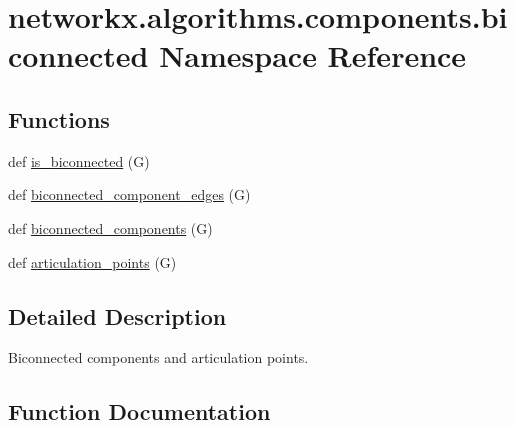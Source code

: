 \hypertarget{namespacenetworkx_1_1algorithms_1_1components_1_1biconnected}{}\section{networkx.\+algorithms.\+components.\+biconnected Namespace Reference}
\label{namespacenetworkx_1_1algorithms_1_1components_1_1biconnected}
\subsection*{Functions}
\begin{DoxyCompactItemize}
\item 
def \hyperlink{namespacenetworkx_1_1algorithms_1_1components_1_1biconnected_a883b29aa8dfc5ce49acd93d453d961f8}{is\+\_\+biconnected} (G)
\item 
def \hyperlink{namespacenetworkx_1_1algorithms_1_1components_1_1biconnected_a04f25e7eda267b9c5c7d63fe6593fd72}{biconnected\+\_\+component\+\_\+edges} (G)
\item 
def \hyperlink{namespacenetworkx_1_1algorithms_1_1components_1_1biconnected_a6b7650342e0d90dab9d3256430eab537}{biconnected\+\_\+components} (G)
\item 
def \hyperlink{namespacenetworkx_1_1algorithms_1_1components_1_1biconnected_aa07e52e2d68677dbf6b1fa4c7d9ee09b}{articulation\+\_\+points} (G)
\end{DoxyCompactItemize}


\subsection{Detailed Description}
\begin{DoxyVerb}Biconnected components and articulation points.\end{DoxyVerb}
 

\subsection{Function Documentation}
\mbox{\label{namespacenetworkx_1_1algorithms_1_1components_1_1biconnected_aa07e52e2d68677dbf6b1fa4c7d9ee09b}} 
